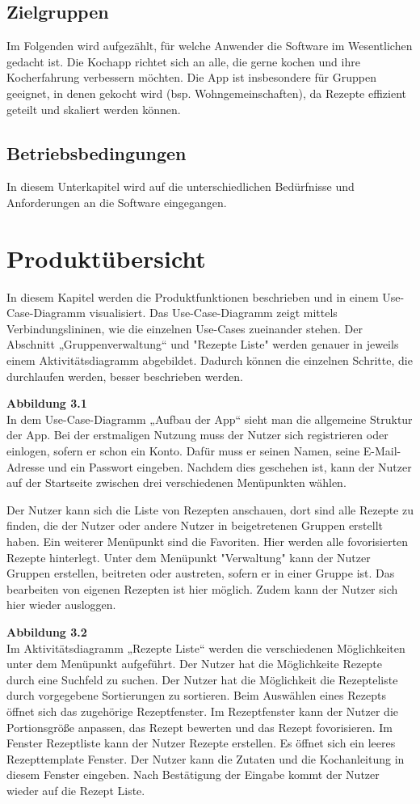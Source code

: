 \documentclass[parskip=full]{scrartcl}
\begin{document}
\subsection{Zielgruppen}
Im Folgenden wird aufgezählt, für welche Anwender die Software im Wesentlichen gedacht ist. 
Die Kochapp richtet sich an alle, die gerne kochen und ihre Kocherfahrung verbessern möchten. 
Die App ist insbesondere für Gruppen geeignet, in denen gekocht wird (bsp. Wohngemeinschaften), da Rezepte effizient geteilt und skaliert werden können.

\subsection{Betriebsbedingungen}
In diesem Unterkapitel wird auf die unterschiedlichen Bedürfnisse und Anforderungen an die Software eingegangen.

\section{Produktübersicht}
In diesem Kapitel werden die Produktfunktionen beschrieben und in einem Use-Case-Diagramm visualisiert.
Das Use-Case-Diagramm zeigt mittels Verbindungslininen, wie die einzelnen Use-Cases zueinander stehen.
Der Abschnitt „Gruppenverwaltung“ und "Rezepte Liste" werden genauer in jeweils einem Aktivitätsdiagramm abgebildet.
Dadurch können die einzelnen Schritte, die durchlaufen werden, besser beschrieben werden.

\textbf{Abbildung 3.1}\\
In dem Use-Case-Diagramm „Aufbau der App“ sieht man die allgemeine Struktur der App.
Bei der erstmaligen Nutzung muss der Nutzer sich registrieren oder einlogen, sofern er schon ein Konto.
Dafür muss er seinen Namen, seine E-Mail-Adresse und ein Passwort eingeben.
Nachdem dies geschehen ist, kann der Nutzer auf der Startseite zwischen drei verschiedenen Menüpunkten wählen.

Der Nutzer kann sich die Liste von Rezepten anschauen, dort sind alle Rezepte zu finden, die der Nutzer oder andere Nutzer in beigetretenen Gruppen erstellt haben.
Ein weiterer Menüpunkt sind die Favoriten.
Hier werden alle fovorisierten Rezepte hinterlegt.
Unter dem Menüpunkt "Verwaltung" kann der Nutzer Gruppen erstellen, beitreten oder austreten, sofern er in einer Gruppe ist.
Das bearbeiten von eigenen Rezepten ist hier möglich.
Zudem kann der Nutzer sich hier wieder ausloggen.

\textbf{Abbildung 3.2}\\
Im Aktivitätsdiagramm „Rezepte Liste“ werden die verschiedenen Möglichkeiten unter dem Menüpunkt aufgeführt.
Der Nutzer hat die Möglichkeite Rezepte durch eine Suchfeld zu suchen.
Der Nutzer hat die Möglichkeit die Rezepteliste durch vorgegebene Sortierungen zu sortieren.
Beim Auswählen eines Rezepts öffnet sich das zugehörige Rezeptfenster.
Im Rezeptfenster kann der Nutzer die Portionsgröße anpassen, das Rezept bewerten und das Rezept fovorisieren.
Im Fenster Rezeptliste kann der Nutzer Rezepte erstellen.
Es öffnet sich ein leeres Rezepttemplate Fenster.
Der Nutzer kann die Zutaten und die Kochanleitung in diesem Fenster eingeben.
Nach Bestätigung der Eingabe kommt der Nutzer wieder auf die Rezept Liste.
\end{document}
